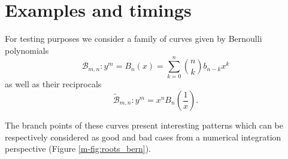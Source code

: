 \documentclass[main.tex]{subfiles}
\begin{document}
  \section{Examples and timings}\label{sec:examples_timings}

    \newcommand{\bern}{\mathcal{B}}
  \newcommand{\bernrev}{\widetilde{\bern}}

  For testing purposes we consider a family of curves given by Bernoulli polynomials
          \begin{equation*}
              \bern_{m,n} : y^m = B_n(x) = \sum_{k=0}^n\binom nkb_{n-k}x^k
          \end{equation*}
  as well as their reciprocals
          \begin{equation*}
              \bernrev_{m,n} : y^m = x^nB_n\left(\frac1x\right).
          \end{equation*}

  The branch points of these curves present interesting patterns which can be respectively considered
  as good and bad cases from a numerical integration perspective (Figure \ref{m-fig:roots_bern}).
\end{document}
